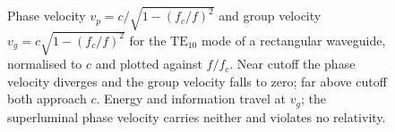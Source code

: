 \begin{figure}[htbp]
\centering
{}
\caption[Phase and group velocity in a waveguide above cutoff]{Phase
velocity $v_p = c/\sqrt{1-(f_c/f)^2}$ and group velocity $v_g =
c\sqrt{1-(f_c/f)^2}$ for the $\text{TE}_{10}$ mode of a rectangular
waveguide, normalised to $c$ and plotted against $f/f_c$. Near cutoff
the phase velocity diverges and the group velocity falls to zero;
far above cutoff both approach $c$. Energy and information travel at
$v_g$; the superluminal phase velocity carries neither and violates no
relativity.}
\label{fig:vol04ch10:waveguide-dispersion}
\end{figure}
